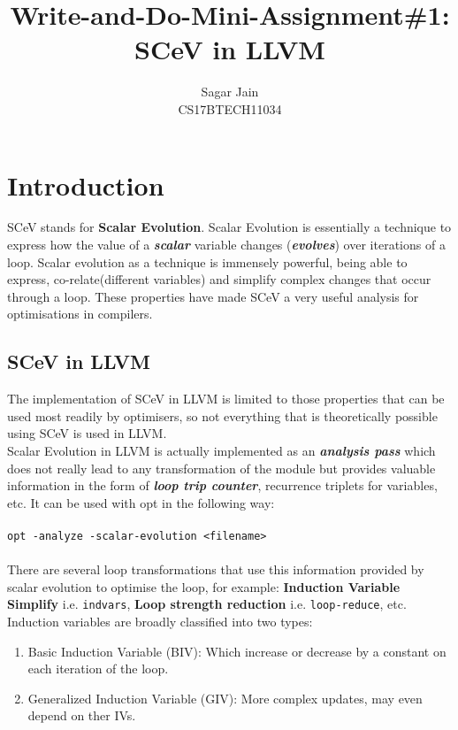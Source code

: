 \documentclass[12pt]{article}
\begin{document}
\title{Write-and-Do-Mini-Assignment\#1: SCeV in LLVM}
\author{Sagar Jain\\CS17BTECH11034}
\maketitle

\section*{Introduction}
SCeV stands for \textbf{Scalar Evolution}. Scalar Evolution is essentially a technique to express how the value of a  \textbf{\textit{scalar}} variable changes (\textbf{\textit{evolves}}) over iterations of a loop. Scalar evolution as a technique is immensely powerful, being able to express, co-relate(different variables) and simplify complex changes that occur through a loop. These properties have made SCeV a very useful analysis for optimisations in compilers.
\subsection*{SCeV in LLVM}
The implementation of SCeV in LLVM is limited to those properties that can be used most readily by optimisers, so not everything that is theoretically possible using SCeV is used in LLVM.\\
Scalar Evolution in LLVM is actually implemented as an \textit{\textbf{analysis pass}} which does not really lead to any transformation of the module but provides valuable information in the form of \textbf{\textit{loop trip counter}}, {recurrence triplets} for variables, etc. It can be used with opt in the following way:\\\\
\texttt{opt -analyze -scalar-evolution <filename>}\\\\
There are several loop transformations that use this information provided by scalar evolution to optimise the loop, for example: \textbf{Induction Variable Simplify} i.e. \texttt{indvars}, \textbf{Loop strength reduction} i.e. \texttt{loop-reduce}, etc.\\

Induction variables are broadly classified into two types:\\
\begin{enumerate}
\item Basic Induction Variable (BIV): Which increase or decrease by a constant on each iteration of the loop.
\item Generalized Induction Variable (GIV): More complex updates, may even depend on ther IVs.
\end{enumerate}
\end{document}
